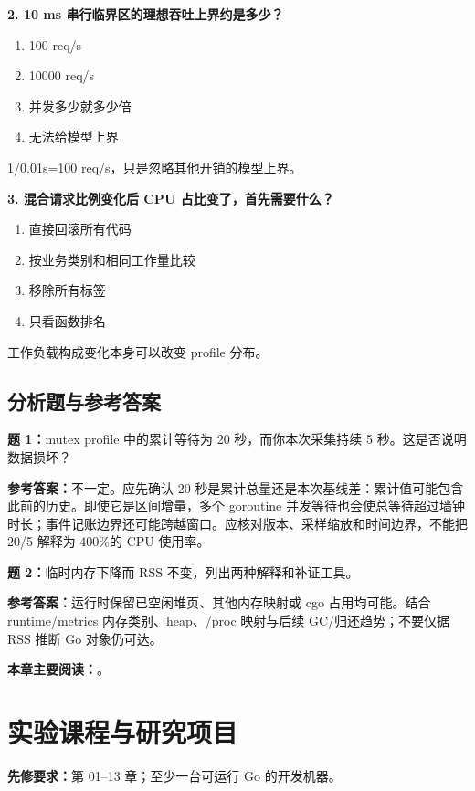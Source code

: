 \documentclass[UTF8,fontset=fandol,openany,11pt]{ctexbook}
\begin{document}
\noindent\textbf{2. 10 ms 串行临界区的理想吞吐上界约是多少？}
\begin{enumerate}[label=\Alph*.]
\item 100 req/s
\item 10000 req/s
\item 并发多少就多少倍
\item 无法给模型上界
\end{enumerate}
1/0.01s=100 req/s，只是忽略其他开销的模型上界。

\noindent\textbf{3. 混合请求比例变化后 CPU 占比变了，首先需要什么？}
\begin{enumerate}[label=\Alph*.]
\item 直接回滚所有代码
\item 按业务类别和相同工作量比较
\item 移除所有标签
\item 只看函数排名
\end{enumerate}
工作负载构成变化本身可以改变 profile 分布。

\section{分析题与参考答案}
\noindent\textbf{题 1：}mutex profile 中的累计等待为 20 秒，而你本次采集持续 5 秒。这是否说明数据损坏？

\noindent\textbf{参考答案：}不一定。应先确认 20 秒是累计总量还是本次基线差：累计值可能包含此前的历史。即使它是区间增量，多个 goroutine 并发等待也会使总等待超过墙钟时长；事件记账边界还可能跨越窗口。应核对版本、采样缩放和时间边界，不能把 20/5 解释为 400\%的 CPU 使用率。

\noindent\textbf{题 2：}临时内存下降而 RSS 不变，列出两种解释和补证工具。

\noindent\textbf{参考答案：}运行时保留已空闲堆页、其他内存映射或 cgo 占用均可能。结合 runtime/metrics 内存类别、heap、/proc 映射与后续 GC/归还趋势；不要仅据 RSS 推断 Go 对象仍可达。

\medskip\noindent\textbf{本章主要阅读：}\cite{go-pprof}\cite{go-http}\cite{go-memory}\cite{go-race}。
\chapter{实验课程与研究项目}
\label{ch:14}
\par\medskip
\noindent\textbf{先修要求：}第 01–13 章；至少一台可运行 Go 的开发机器。
\end{document}
